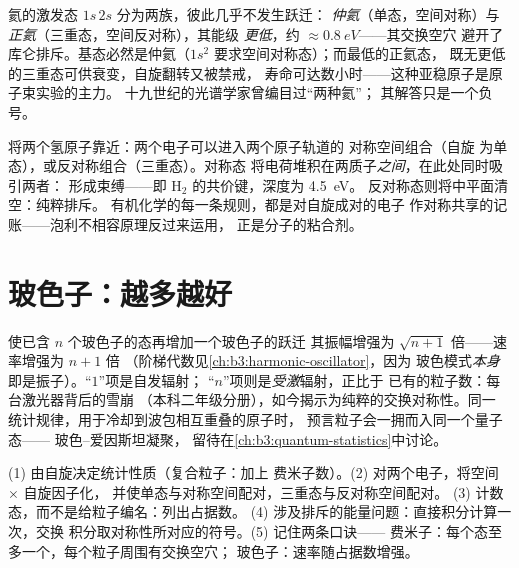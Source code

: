 \begin{example}[同一原子中的两种氦]\label{ex:b3:identical-particles:helium}
氦的激发态 $1s\,2s$ 分为两族，彼此几乎不发生跃迁：
\emph{仲氦}（单态，空间对称）与
\emph{正氦}（三重态，空间反对称），其能级
\emph{更低}，约 $\approx\qty{0.8}{eV}$——其交换空穴
避开了库仑排斥。基态必然是仲氦（$1s^2$
要求空间对称态）；而最低的正氦态，
既无更低的三重态可供衰变，自旋翻转又被禁戒，
寿命可达数小时——这种亚稳原子是原子束实验的主力。
十九世纪的光谱学家曾编目过“两种氦”；
其解答只是一个负号。
\end{example}

\begin{example}[共价键]\label{ex:b3:identical-particles:bond}
将两个氢原子靠近：两个电子可以进入两个原子轨道的
对称空间组合（自旋
为单态），或反对称组合（三重态）。对称态
将电荷堆积在两质子\emph{之间}，在此处同时吸引两者：
形成束缚——即 H$_2$ 的共价键，深度为 \qty{4.5}{eV}。
反对称态则将中平面清空：纯粹排斥。
有机化学的每一条规则，都是对自旋成对的电子
作对称共享的记账——泡利不相容原理反过来运用，
正是分子的粘合剂。
\end{example}

\section{玻色子：越多越好}

\begin{proposition}[玻色增强]\label{prop:b3:identical-particles:enhancement}
使已含 $n$ 个玻色子的态再增加一个玻色子的跃迁
其振幅增强为 $\sqrt{n + 1}$ 倍——速率增强为 $n + 1$ 倍
（阶梯代数见\cref{ch:b3:harmonic-oscillator}，因为
玻色模式\emph{本身}即是振子）。“$1$”项是自发辐射；
“$n$”项则是\emph{受激}辐射，正比于
已有的粒子数：每台激光器背后的雪崩
（本科二年级分册），如今揭示为纯粹的交换对称性。同一
统计规律，用于冷却到波包相互重叠的原子时，
预言粒子会一拥而入同一个量子态——
玻色–爱因斯坦凝聚，
留待在\cref{ch:b3:quantum-statistics}中讨论。
\end{proposition}
\admitted

\begin{method}[处理全同粒子]\label{met:b3:identical-particles:method}
(1) 由自旋决定统计性质（复合粒子：加上
费米子数）。(2) 对两个电子，将空间 $\times$ 自旋因子化，
并使单态与对称空间配对，三重态与反对称空间配对。
(3) 计数态，而不是给粒子编名：列出占据数。
(4) 涉及排斥的能量问题：直接积分计算一次，交换
积分取对称性所对应的符号。(5) 记住两条口诀——
费米子：每个态至多一个，每个粒子周围有交换空穴；
玻色子：速率随占据数增强。
\end{method}

